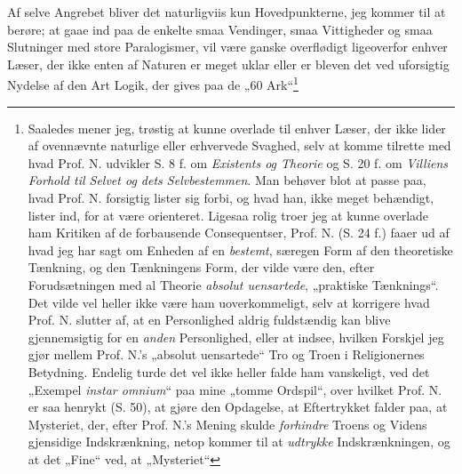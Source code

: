 \documentclass[12pt,a4paper]{book}
\newcommand{\opage}[1]{\marginnote{\footnotesize\textit{[#1]}}}
\begin{document}
\opage{10} %
\setcounter{footnote}{0}
Af selve Angrebet bliver det naturligviis kun Hovedpunkterne, jeg kommer til at
berøre; at gaae ind paa de enkelte smaa Vendinger, smaa Vittigheder og smaa
Slutninger med store Paralogismer, vil være ganske overflødigt ligeoverfor
enhver Læser, der ikke enten af Naturen er meget uklar eller er bleven det ved
uforsigtig Nydelse af den Art Logik, der gives paa de „60 Ark“\footnote{%
  Saaledes mener jeg, trøstig at kunne overlade til enhver Læser, der ikke lider
  af ovennævnte naturlige eller erhvervede Svaghed, selv at komme tilrette med
  hvad Prof. N. udvikler S. 8 f. om \emph{Existents og Theorie} og S. 20 f. om
  \emph{Villiens Forhold til Selvet og dets Selvbestemmen}. Man behøver blot at
  passe paa, hvad Prof. N. forsigtig lister sig forbi, og hvad han, ikke meget
  behændigt, lister ind, for at være orienteret. Ligesaa rolig troer jeg at
  kunne overlade ham Kritiken af de forbausende Consequentser, Prof. N.
  (S. 24 f.) faaer ud af hvad jeg har sagt om Enheden af en \emph{bestemt},
  særegen Form af den theoretiske Tænkning, og den Tænkningens Form, der vilde
  være den, efter Forudsætningen med al Theorie \emph{absolut uensartede},
  „praktiske Tænknings“. Det vilde vel heller ikke være ham uoverkommeligt, selv
  at korrigere hvad Prof. N. slutter af, at en Personlighed aldrig fuldstændig
  kan blive gjennemsigtig for en \emph{anden} Personlighed, eller at indsee,
  hvilken Forskjel jeg gjør mellem Prof. N.'s „absolut uensartede“ Tro og Troen
  i Religionernes Betydning. Endelig turde det vel ikke heller falde ham
  vanskeligt, ved det „Exempel \textit{instar omnium}“ paa mine „tomme Ordspil“,
  over hvilket Prof. N. er saa henrykt (S. 50), at gjøre den Opdagelse, at
  Eftertrykket falder paa, at Mysteriet, der, efter Prof. N.'s Mening skulde
  \emph{forhindre} Troens og Videns gjensidige Indskrænkning, netop kommer til
  at \emph{udtrykke} Indskrænkningen, og at det „Fine“ ved, at „Mysteriet“
}
\end{document}
